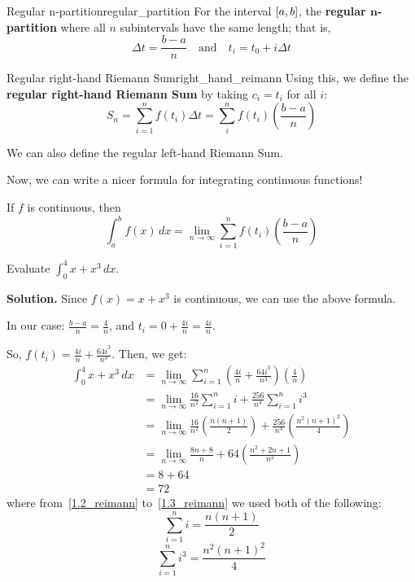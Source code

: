 \begin{Definition}{Regular n-partition}{regular_partition}
    For the interval $ \interval{a}{b} $, the \textbf{regular $ \bm{n} $-partition}
    where all $ n $ subintervals
    have the same length; that is,
    \[ \Delta t=\frac{b-a}{n} \quad\text{and}\quad  t_i=t_0+i\Delta t \]
\end{Definition}

\begin{Definition}{Regular right-hand Riemann Sum}{right_hand_reimann}
    Using this, we define the \textbf{regular right-hand Riemann Sum} by taking $ c_i=t_i $ for
    all $ i $:
    \[ S_n=\sum\limits_{i=1}^{n} f(t_i)\Delta t=\sum\limits_{i}^{n} f(t_i)\left(\frac{b-a}{n}\right) \]
\end{Definition}

\begin{Remark}{}{}
    We can also define the regular left-hand Riemann Sum.
\end{Remark}

Now, we can write a nicer formula for integrating continuous functions!

If $ f $ is continuous, then
\[ \int_{a}^{b} f(x)\, d{x} =
    \lim\limits_{{n} \to {\infty}} \sum\limits_{i=1}^{n} f(t_i)\left(\frac{b-a}{n}\right) \]

\begin{Example}{}{}
    Evaluate
    $ \displaystyle\int_{0}^{4} x+x^3\, d{x} $.

    \textbf{Solution.}
    Since $ f(x)=x+x^3 $ is continuous, we can use the above formula.

    In our case: $ \frac{b-a}{n} = \frac{4}{n} $, and $ t_i = 0+\frac{4i}{n} = \frac{4i}{n} $.

    So, $ f(t_i) = \frac{4i}{n} + \frac{64i^3}{n^3} $.
    Then, we get:
    \begin{align}
        \int_{0}^{4} x+x^3\, d{x}
         & = \lim\limits_{{n} \to {\infty}} \sum\limits_{i=1}^{n}
        \left( \frac{4i}{n} +\frac{64i^3}{n^3} \right)\left( \frac{4}{n} \right)                  \\
         & = \lim\limits_{{n} \to {\infty}} \frac{16}{n^2} \sum\limits_{i=1}^{n} i +
        \frac{256}{n^4} \sum\limits_{i=1}^{n} i^3 \label{1.2_reimann}                             \\
         & = \lim\limits_{{n} \to {\infty}} \frac{16}{n^2} \left( \frac{n(n+1)}{2} \right) +
        \frac{256}{n^4} \left( \frac{n^2(n+1)^2}{4} \right) \label{1.3_reimann}                   \\
         & = \lim\limits_{{n} \to {\infty}} \frac{8n+8}{n} +64 \left(\frac{n^2+2n+1}{n^2} \right) \\
         & = 8+64                                                                                 \\
         & =72
    \end{align}
    where from~\ref{1.2_reimann} to~\ref{1.3_reimann} we used both of the following:
    \[ \sum\limits_{i=1}^{n} i=\frac{n(n+1)}{2} \]
    \[ \sum\limits_{i=1}^{n} i^3=\frac{n^2(n+1)^2}{4} \]
\end{Example}

